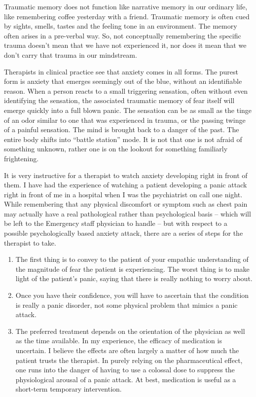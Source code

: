 \documentclass[]{book}
\begin{document}
Traumatic memory does not function like narrative memory in our ordinary life, like remembering coffee yesterday with a friend. Traumatic memory is often cued by sights, smells, tastes and the feeling tone in an environment. The memory often arises in a pre-verbal way. So, not conceptually remembering the specific trauma doesn't mean that we have not experienced it, nor does it mean that we don't carry that trauma in our mindstream.

Therapists in clinical practice see that anxiety comes in all forms. The purest form is anxiety that emerges seemingly out of the blue, without an identifiable reason. When a person reacts to a small triggering sensation, often without even identifying the sensation, the associated traumatic memory of fear itself will emerge quickly into a full blown panic. The sensation can be as small as the tinge of an odor similar to one that was experienced in trauma, or the passing twinge of a painful sensation. The mind is brought back to a danger of the past. The entire body shifts into ``battle station'' mode. It is not that one is not afraid of something unknown, rather one is on the lookout for something familiarly frightening.

It is very instructive for a therapist to watch anxiety developing right in front of them. I have had the experience of watching a patient developing a panic attack right in front of me in a hospital when I was the psychiatrist on call one night. While remembering that any physical discomfort or symptom such as chest pain may actually have a real pathological rather than psychological basis -- which will be left to the Emergency staff physician to handle -- but with respect to a possible psychologically based anxiety attack, there are a series of steps for the therapist to take.

\begin{enumerate}
\def\labelenumi{\arabic{enumi}.}
\item
  The first thing is to convey to the patient of your empathic understanding of the magnitude of fear the patient is experiencing. The worst thing is to make light of the patient's panic, saying that there is really nothing to worry about.
\item
  Once you have their confidence, you will have to ascertain that the condition is really a panic disorder, not some physical problem that mimics a panic attack.
\item
  The preferred treatment depends on the orientation of the physician as well as the time available. In my experience, the efficacy of medication is uncertain. I believe the effects are often largely a matter of how much the patient trusts the therapist. In purely relying on the pharmaceutical effect, one runs into the danger of having to use a colossal dose to suppress the physiological arousal of a panic attack. At best, medication is useful as a short-term temporary intervention.
\end{enumerate}
\end{document}
